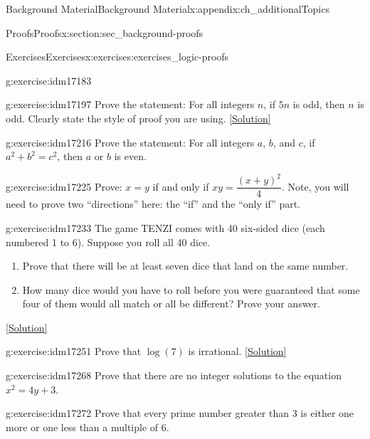 \documentclass[oneside,10pt,]{book}
\numberwithin{equation}{chapter}
\begin{document}
\begin{appendixptx}{Background Material}{}{Background Material}{}{}{x:appendix:ch_additionalTopics}
\begin{sectionptx}{Proofs}{}{Proofs}{}{}{x:section:sec_background-proofs}
\begin{exercises-subsection}{Exercises}{}{Exercises}{}{}{x:exercises:exercises_logic-proofs}
\begin{divisionexercise}{7}{}{}{g:exercise:idm17183}
\begin{enumerate}[label=(\alph*)]
\end{enumerate}
%
\end{divisionexercise}%
\begin{divisionexercise}{8}{}{}{g:exercise:idm17197}%
Prove the statement: For all integers \(n\), if \(5n\) is odd, then \(n\) is odd. Clearly state the style of proof you are using.%
\space\hspace*{0pt}\hfill{\tiny\hyperlink{g:solution:idm17203-main}{[Solution]}}\end{divisionexercise}%
\begin{divisionexercise}{9}{}{}{g:exercise:idm17216}%
Prove the statement: For all integers \(a\), \(b\), and \(c\), if \(a^2 + b^2 = c^2\), then \(a\) or \(b\) is even.%
\end{divisionexercise}%
\begin{divisionexercise}{10}{}{}{g:exercise:idm17225}%
Prove: \(x=y\) if and only if \(xy=\dfrac{(x+y)^2}{4}\). Note, you will need to prove two ``directions'' here: the ``if'' and the ``only if'' part.%
\end{divisionexercise}%
\begin{divisionexercise}{11}{}{}{g:exercise:idm17233}%
The game TENZI comes with 40 six-sided dice (each numbered 1 to 6). Suppose you roll all 40 dice.%
\begin{enumerate}[label=(\alph*)]
\item{}Prove that there will be at least seven dice that land on the same number.%
\item{}How many dice would you have to roll before you were guaranteed that some four of them would all match or all be different? Prove your answer.%
\end{enumerate}
%
\space\hspace*{0pt}\hfill{\tiny\hyperlink{g:solution:idm17240-main}{[Solution]}}\end{divisionexercise}%
\begin{divisionexercise}{12}{}{}{g:exercise:idm17251}%
Prove that \(\log(7)\) is irrational.%
\space\hspace*{0pt}\hfill{\tiny\hyperlink{g:solution:idm17255-main}{[Solution]}}\end{divisionexercise}%
\begin{divisionexercise}{13}{}{}{g:exercise:idm17268}%
Prove that there are no integer solutions to the equation \(x^2 = 4y + 3\).%
\end{divisionexercise}%
\begin{divisionexercise}{14}{}{}{g:exercise:idm17272}%
Prove that every prime number greater than 3 is either one more or one less than a multiple of 6.%

\end{divisionexercise}
\end{exercises-subsection}
\end{sectionptx}
\end{appendixptx}
\end{document}
